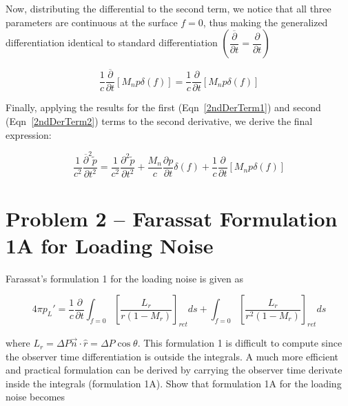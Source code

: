 \documentclass[]{aiaa-tc}%
\begin{document}
Now, distributing the differential to the second term, we notice that all three parameters are continuous at the surface $f=0$, thus making the generalized differentiation identical to standard differentiation $\left(\dfrac{\overline{\partial}}{\partial t} = \dfrac{\partial}{\partial t} \right)$

\begin{equation} \label{2ndDerTerm2}
\dfrac{1}{c}\dfrac{\overline{\partial}}{\partial t}\left[ M_n p\delta(f)\right]
    = \dfrac{1}{c}\dfrac{\partial}{\partial t} \left[ M_n p\delta(f) \right]
\end{equation}

Finally, applying the results for the first (Eqn~\ref{2ndDerTerm1}) and second (Eqn~\ref{2ndDerTerm2}) terms to the second derivative, we derive the final expression:

\begin{equation} \label{2ndDer}
\dfrac{1}{c^2}\dfrac{\overline{\partial}^2\widetilde{p}}{\partial t^2}
= \dfrac{1}{c^2} \dfrac{\partial^2\widetilde{p}}{\partial t^2}
    + \dfrac{M_n}{c} \dfrac{\partial p}{\partial t}  \delta(f)
+ \dfrac{1}{c}\dfrac{\partial}{\partial t} \left[ M_n p\delta(f) \right]
\end{equation}


\section{Problem 2 -- Farassat Formulation 1A for Loading Noise} \label{SecFarassat}


Farassat’s formulation 1 for the loading noise is given as

\begin{equation} \label{FarassatForm1Loading}
4\pi p_{L}' = \dfrac{1}{c} \dfrac{\partial}{\partial t}
      \int_{f=0} \left[ \dfrac{L_r}{r   (1 - M_r)} \right]_{ret} ds
    + \int_{f=0} \left[ \dfrac{L_r}{r^2 (1 - M_r)} \right]_{ret} ds
\end{equation}


\noindent where $L_r = \Delta P \vec{n} \cdot \hat{r} = \Delta P \cos\theta$. This formulation 1 is difficult to compute since the observer time differentiation is outside the integrals. A much more efficient and practical formulation can be derived by carrying the observer time derivate inside the integrals (formulation 1A). Show that formulation 1A for the loading noise becomes
\end{document}

